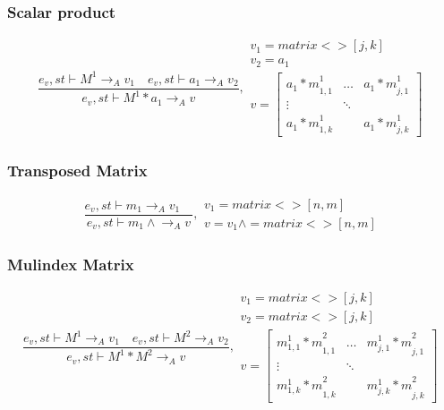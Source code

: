 \subsubsection{Scalar product}
\begin{equation}
	\frac { { e }_{ v },st\vdash { M }^{ 1 }{ \rightarrow  }_{ A }{ v }_{ 1 }\quad { e }_{ v },st\vdash { a }_{ 1 }{ \rightarrow  }_{ A }{ v }_{ 2 } }{ { e }_{ v },st\vdash { M }^{ 1 }\ast { a }_{ 1 }{ \rightarrow  }_{ A }{ v } } ,\begin{matrix} { v }_{ 1 }=matrix<>[j,k] \\ { v }_{ 2 }={ a }_{ 1 } \\ v=\begin{bmatrix} { { a }_{ 1 }*m }_{ 1,1 }^{ 1 } & \dots  & { { a }_{ 1 }*m }_{ j,1 }^{ 1 } \\ \vdots  & \ddots  &  \\ { { a }_{ 1 }*m }_{ 1,k }^{ 1 } &  & { { a }_{ 1 }*m }_{ j,k }^{ 1 } \end{bmatrix} \end{matrix}
\end{equation}

\subsubsection{Transposed Matrix}
\begin{equation}
	\frac { { e }_{ v },st\vdash { m }_{ 1 }{ \rightarrow  }_{ A }{ v }_{ 1 }\quad  }{ { e }_{ v },st\vdash { m }_{ 1 }\wedge { \rightarrow  }_{ A }{ v } } ,\begin{matrix} { v }_{ 1 }=matrix<>[n,m] \\ { v }={ v }_{ 1 }\wedge =matrix<>[n,m] \end{matrix}
\end{equation}

\subsubsection{Mulindex Matrix}
\begin{equation}
	\frac { { e }_{ v },st\vdash { M }^{ 1 }{ \rightarrow  }_{ A }{ v }_{ 1 }\quad { e }_{ v },st\vdash { M }^{ 2 }{ \rightarrow  }_{ A }{ v }_{ 2 } }{ { e }_{ v },st\vdash { M }^{ 1 }\ast { M }^{ 2 }{ \rightarrow  }_{ A }{ v } } ,\begin{matrix} { v }_{ 1 }=matrix<>[j,k] \\ { { v }_{ 2 } }=matrix<>[j,k] \\ v=\begin{bmatrix} { { m }_{ 1,1 }^{ 1 }*m }_{ 1,1 }^{ 2 } & \dots  & { { m }_{ j,1 }^{ 1 }*m }_{ j,1 }^{ 2 } \\ \vdots  & \ddots  &  \\ { { m }_{ 1,k }^{ 1 }*m }_{ 1,k }^{ 2 } &  & { { m }_{ j,k }^{ 1 }*m }_{ j,k }^{ 2 } \end{bmatrix} \end{matrix}
\end{equation}

